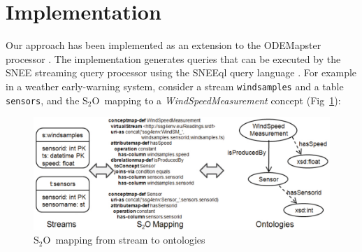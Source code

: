 \documentclass[runningheads,a4paper]{llncs}
\newcommand{\subscript}[1]{\ensuremath{_{\textrm{#1}}}}
\newcommand{\stwoo}{\textsf{S\subscript{2}O}}
\begin{document}
\vspace{-10pt}
\section{Implementation}
\label{execution}
\vspace{-5pt}
Our approach has been implemented as an extension to the
ODEMapster processor \cite{Barrasa_04}. The implementation generates queries that can be executed by the SNEE streaming query processor using the SNEEql query language \cite{Brenninkmeijer_08}. For example in a weather early-warning system, consider a stream \texttt{windsamples} and a table \texttt{sensors}, and the \stwoo\ mapping to a \textit{WindSpeedMeasurement} concept (Fig~\ref{fig:Mappings}):

\begin{figure}[here]
\vspace{-10pt} \hspace{20pt}
\includegraphics[width=12 cm]{img/mapping}
\vspace{-17pt} \caption{\stwoo\ mapping from stream to ontologies} \label{fig:Mappings} 
\vspace{-15pt}
\end{figure}
\end{document}
